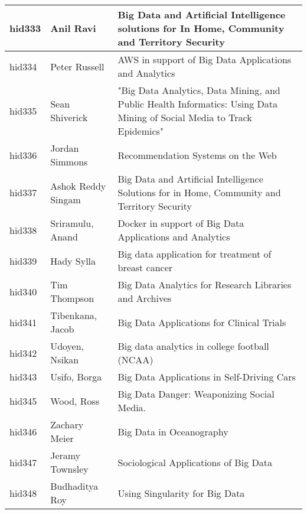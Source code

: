 \documentclass[12pt]{book}
\begin{document}
\begin{footnotesize}
\begin{longtable}{|p{1cm}p{5cm}p{9cm}|}
\hline
hid333 & Anil Ravi & Big Data and Artificial Intelligence solutions for In Home, Community and Territory Security  \\
\hline
hid334 & Peter Russell & AWS in support of Big Data Applications and Analytics  \\
\hline
hid335 & Sean Shiverick & "Big Data Analytics, Data Mining, and Public Health Informatics:  Using Data Mining of Social Media to Track Epidemics"
  \\
\hline
hid336 & Jordan Simmons & Recommendation Systems on the Web  \\
\hline
hid337 & Ashok Reddy Singam & Big Data and Artificial Intelligence Solutions for in Home, Community and Territory Security  \\
\hline
hid338 & Sriramulu, Anand & Docker in support of Big Data Applications and Analytics  \\
\hline
hid339 & Hady Sylla & Big data application for treatment of breast cancer  \\
\hline
hid340 & Tim Thompson & Big Data Analytics for Research Libraries and Archives  \\
\hline
hid341 & Tibenkana, Jacob & Big Data Applications for Clinical Trials  \\
\hline
hid342 & Udoyen, Nsikan & Big data analytics in college football (NCAA)  \\
\hline
hid343 & Usifo, Borga & Big Data Applications in Self-Driving Cars  \\
\hline
hid345 & Wood, Ross & Big Data Danger: Weaponizing Social Media.  \\
\hline
hid346 & Zachary Meier & Big Data in Oceanography  \\
\hline
hid347 & Jeramy Townsley & Sociological Applications of Big Data  \\
\hline
hid348 & Budhaditya Roy & Using Singularity for Big Data  \\
\hline
\end{longtable}
\end{footnotesize}
\newpage
\end{document}
